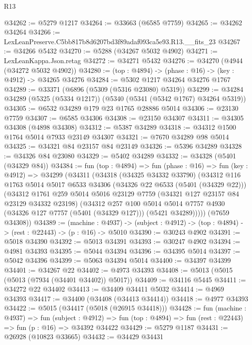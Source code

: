\begin{lexlean}{R13}
\begin{coremodule}
@34262 := @5279 @1217
@34264 := @33663 (@6585 @7759)
@34265 := @34262 @34264
@34266 := LexLeanPreserve.C5bb817b8d6207bd3f89adaf093ca5e93.R13.__fits_23
@34267 := @34266 @5432
@34270 := @5288 (@34267 @5032 @4902)
@34271 := LexLeanKappa.Json.retag
@34272 := @34271 @5432
@34276 := @34270 (@4944 (@34272 @5032 @4902))
@34280 := (top : @4894) -> (phase : @16) -> (key : @4912) -> @34265 @34276
@34284 := @5302 @1217 @34264 @34276 @1767
@34289 := @33371 (@6896 (@5309 (@5316 @23080) @5319))
@34299 := @34284 @34289 (@5325 (@5334 @1217)) (@5340 (@5341 (@5342 @1767) @34264 @5319))
@34305 := @6532 @34289 @179 @23 @1765 @28886 @5014
@34306 := @23130 @7759
@34307 := @6585 @34306
@34308 := @23150 @34307
@34311 := @34305 @34308 (@4898 @34308)
@34312 := @5387 @34289
@34318 := @34312 @1500 @1764 @5014 @7933 @23149 @34307
@34321 := @7670 @34289 @98 @5014
@34325 := @34321 @84 @23157 @84 @23149
@34326 := @5396 @34289
@34328 := @34326 @84 @23080
@34329 := @5402 @34289
@34332 := @34328 (@5401 (@34329 @84))
@34384 := fun (top : @4894) =>
  fun (phase : @16) =>
  fun (key : @4912) =>
  @34299
    (@34311
      (@34318
        (@34325 @34332 @33790)
        (@34312
          @116
          @1763
          @5014
          @5017
          @6533
          @34306
          (@34326 @22 @6533 (@5401 (@34329 @22)))
          (@34312
            @1761
            @259
            @5014
            @5016
            @23129
            @7759
            (@34321 @127 @23157 @84 @23129 @34332 @23198)
            (@34312
              @257
              @100
              @5014
              @5014
              @7757
              @4930
              (@34326 @127 @7757 (@5401 (@34329 @127)))
              (@5421 @34289)))))
      (@7659 @34308))
@34389 := (machine : @4937) ->
  (subject : @4912) -> (top : @4894) -> (rest : @22443) -> (p : @16) -> @5010
@34390 := @30243 @4902
@34391 := @5018 @34390
@34392 := @5013 @34391
@34393 := @30247 @4902
@34394 := @4981 @34393
@34395 := @5044 @34394
@34396 := @34395 @5014
@34397 := @5042 @34396
@34399 := @5063 @34394 @5014
@34400 := @34397 @34399
@34401 := @34267 @22
@34402 := @4973 @34393
@34408 := @5013 (@5015 (@5013 (@7934 (@34401 @34402)) @5017))
@34409 := @34116 @5445
@34411 := @34272 @22 @34402
@34413 := @34409 @34411 @5032
@34414 := @4969 @34393
@34417 := @34400 (@34408 (@34413 @34414))
@34418 := @4977 @34393
@34422 := @5015 (@34417 (@5018 (@26915 @34418)))
@34428 := fun (machine : @4937) =>
  fun (subject : @4912) =>
  fun (top : @4894) => fun (rest : @22443) => fun (p : @16) => @34392 @34422
@34429 := @5279 @1187
@34431 := @26928 (@10823 @33665)
@34432 := @34429 @34431

\end{coremodule}
\end{lexlean}
